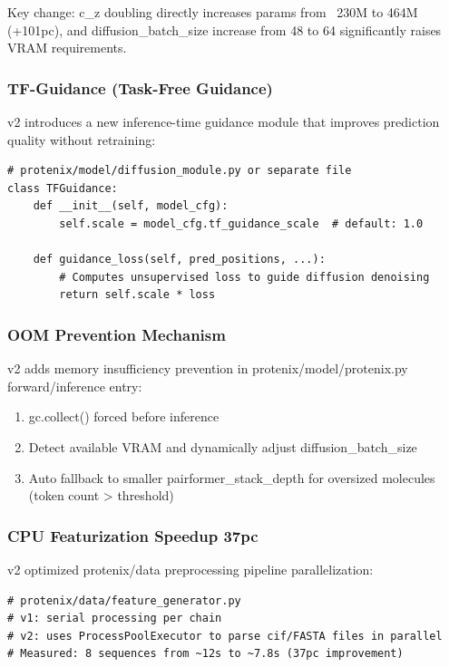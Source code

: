 \documentclass[12pt,a4paper]{article}
\begin{document}
Key change: c_z doubling directly increases params from ~230M to 464M (+101pc), and diffusion_batch_size increase from 48 to 64 significantly raises VRAM requirements.

\subsubsection{TF-Guidance (Task-Free Guidance)}

v2 introduces a new inference-time guidance module that improves prediction quality without retraining:

\begin{verbatim}
# protenix/model/diffusion_module.py or separate file
class TFGuidance:
    def __init__(self, model_cfg):
        self.scale = model_cfg.tf_guidance_scale  # default: 1.0

    def guidance_loss(self, pred_positions, ...):
        # Computes unsupervised loss to guide diffusion denoising
        return self.scale * loss
\end{verbatim}

\subsubsection{OOM Prevention Mechanism}

v2 adds memory insufficiency prevention in protenix/model/protenix.py forward/inference entry:
\begin{enumerate}
    \item gc.collect() forced before inference
    \item Detect available VRAM and dynamically adjust diffusion_batch_size
    \item Auto fallback to smaller pairformer_stack_depth for oversized molecules (token count > threshold)
\end{enumerate}

\subsubsection{CPU Featurization Speedup 37pc}

v2 optimized protenix/data preprocessing pipeline parallelization:
\begin{verbatim}
# protenix/data/feature_generator.py
# v1: serial processing per chain
# v2: uses ProcessPoolExecutor to parse cif/FASTA files in parallel
# Measured: 8 sequences from ~12s to ~7.8s (37pc improvement)
\end{verbatim}
\end{document}
